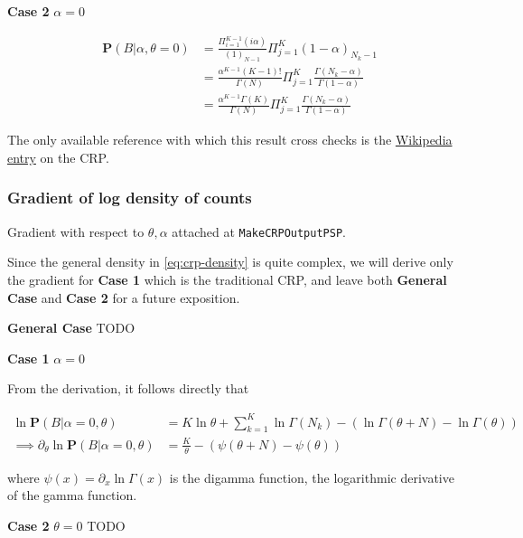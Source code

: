 \documentclass[12pt]{article}
\begin{document}
\textbf{Case 2} $\alpha = 0$

\begin{eqnarray*}
&\mathbf{P}(B|\alpha,\theta=0)
    & = \frac{\Pi_{i=1}^{K-1}(i\alpha)}{(1)_{N-1}}\Pi_{j=1}^K(1-\alpha)_{N_k-1}\\
&   & = \frac{\alpha^{K-1}(K-1)!}{\Gamma(N)}\Pi_{j=1}^K
            \frac{\Gamma(N_k-\alpha)}{\Gamma(1-\alpha)}\\
&   & = \frac{\alpha^{K-1}\Gamma(K)}{\Gamma(N)}\Pi_{j=1}^K
\frac{\Gamma(N_k-\alpha)}{\Gamma(1-\alpha)}
\end{eqnarray*}

The only available reference with which this result cross checks is the
\href{https://en.wikipedia.org/wiki/Chinese_restaurant_process#Generalization}
{Wikipedia entry} on the CRP.

\subsubsection{Gradient of log density of counts}

Gradient with respect to $\theta, \alpha$ attached at \texttt{MakeCRPOutputPSP}.

Since the general density in \eqref{eq:crp-density} is quite complex, we will derive
only the gradient for \textbf{Case 1} which is the traditional CRP,
and leave both \textbf{General Case} and \textbf{Case 2} for a
future exposition.

\textbf{General Case} TODO

\textbf{Case 1} $\alpha = 0$

From the derivation, it follows directly that

\begin{align*}
\ln\mathbf{P}(B|\alpha=0,\theta)
    & = K\ln\theta + \sum_{k=1}^{K}\ln\Gamma(N_k) -(\ln\Gamma(\theta+N)-\ln\Gamma(\theta))\\
\implies \partial_\theta\ln\mathbf{P}(B|\alpha=0,\theta)
    &= \frac{K}{\theta} - (\psi(\theta+N) - \psi(\theta))
\end{align*}

where $\psi(x) = \partial_x\ln\Gamma(x)$ is the digamma function, the logarithmic
derivative of the gamma function.

\textbf{Case 2} $\theta = 0$ TODO
\end{document}
